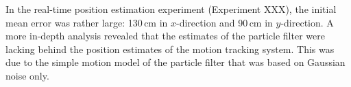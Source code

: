 In the real-time position estimation experiment (Experiment XXX), the initial mean error was rather large: 130\,cm in $x$-direction and 90\,cm in $y$-direction. A more in-depth analysis revealed that the estimates of the particle filter were lacking behind the position estimates of the motion tracking system. This was due to the simple motion model of the particle filter that was based on Gaussian noise only.    